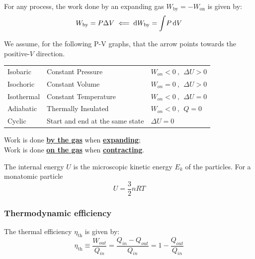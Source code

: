 \documentclass[11pt]{article}
\numberwithin{equation}{section}
\begin{document}
			For any process, the work done by an expanding gas $W_{\text{by}}=-W_{\text{on}}$ is given by:
			\begin{equation*}
				W_{\text{by}}=P\Delta V \impliedby \dif W_{\text{by}} = \int\! P \dif V
				\vspace{-1em}
			\end{equation*}
			
			We assume, for the following P-V graphs, that the arrow points towards the positive-$V$ direction. 
			\begin{center}
				\renewcommand{\arraystretch}{1.2}
				\begin{tabular}{@{} l l l @{}}
					\toprule
					Isobaric & Constant Pressure  & $W_{on} < 0 ~,~~ \Delta U > 0$\\
					Isochoric & Constant Volume & $W_{on} = 0 ~,~~ \Delta U > 0$\\
					Isothermal & Constant Temperature & $W_{on} < 0 ~,~~ \Delta U = 0$\\
					Adiabatic & Thermally Insulated & $W_{on} < 0 ~,~~ Q = 0$\\
					Cyclic & Start and end at the same state & $\Delta U = 0$\\
					\bottomrule
				\end{tabular}
			\end{center}
			\vspace{\parskip}		
			Work is done \underline{\textbf{by the gas}} when \underline{\textbf{expanding}}; \\
			Work is done \underline{\textbf{on the gas}} when \underline{\textbf{contracting}}.
			
			The internal energy $U$ is the microscopic kinetic energy $E_k$ of the particles. For a monatomic particle $$U=\frac{3}{2}nRT$$
			\subsubsection{Thermodynamic efficiency}
			The thermal efficiency $\eta_\text{th}$ is given by:
			\begin{equation*}
				\eta _{\text{th}}\equiv {\frac {W_{out}}{Q_{in}}}={\frac {{Q_{in}}-Q_{out}}{Q_{in}}}=1-{\frac {Q_{out}}{Q_{in}}}
			\end{equation*}
			
\end{document}
